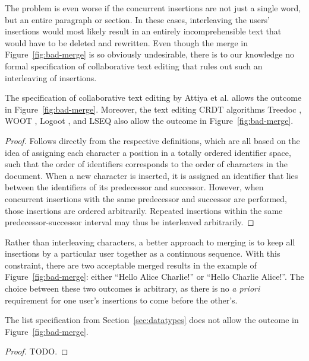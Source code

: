The problem is even worse if the concurrent insertions are not just a single word, but an entire paragraph or section.
In these cases, interleaving the users' insertions would most likely result in an entirely incomprehensible text that would have to be deleted and rewritten.
Even though the merge in Figure~\ref{fig:bad-merge} is so obviously undesirable, there is to our knowledge no formal specification of collaborative text editing that rules out such an interleaving of insertions.

\begin{proposition}\label{prop:attiya-allows-interleaving}
    The specification of collaborative text editing by Attiya et al. \cite{Attiya:2016kh} allows the outcome in Figure~\ref{fig:bad-merge}.
    Moreover, the text editing CRDT algorithms Treedoc \cite{Preguica:2009fz}, WOOT \cite{Oster:2006wj}, Logoot \cite{Weiss:2010hx}, and LSEQ \cite{Nedelec:2013ky,Nedelec:2016eo} also allow the outcome in Figure~\ref{fig:bad-merge}.
\end{proposition}
\begin{proof}
    Follows directly from the respective definitions, which are all based on the idea of assigning each character a position in a totally ordered identifier space, such that the order of identifiers corresponds to the order of characters in the document.
    When a new character is inserted, it is assigned an identifier that lies between the identifiers of its predecessor and successor.
    However, when concurrent insertions with the same predecessor and successor are performed, those insertions are ordered arbitrarily.
    Repeated insertions within the same predecessor-successor interval may thus be interleaved arbitrarily.
\end{proof}

Rather than interleaving characters, a better approach to merging is to keep all insertions by a particular user together as a continuous sequence.
With this constraint, there are two acceptable merged results in the example of Figure~\ref{fig:bad-merge}: either ``Hello Alice Charlie!'' or ``Hello Charlie Alice!''.
The choice between these two outcomes is arbitrary, as there is no \emph{a priori} requirement for one user's insertions to come before the other's.

\begin{proposition}\label{prop:no-interleaving}
    The list specification from Section~\ref{sec:datatypes} does not allow the outcome in Figure~\ref{fig:bad-merge}.
\end{proposition}
\begin{proof}
    TODO.
\end{proof}

